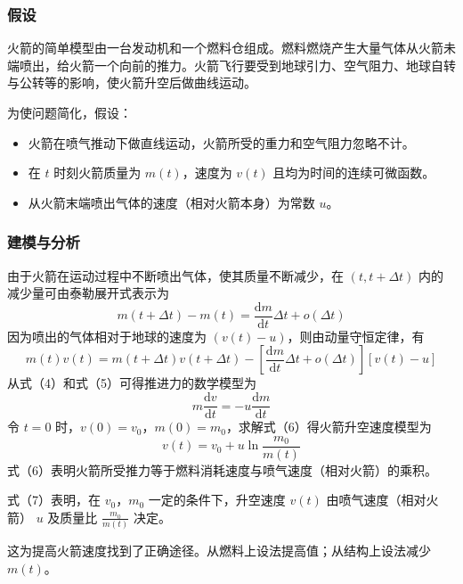 \documentclass[a4,10pt,zihao=-4]{ctexart}
\begin{document}
\subsubsection{假设}

火箭的简单模型由一台发动机和一个燃料仓组成。燃料燃烧产生大量气体从火箭未端喷出，给火箭一个向前的推力。火箭飞行要受到地球引力、空气阻力、地球自转与公转等的影响，使火箭升空后做曲线运动。

为使问题简化，假设：

\begin{itemize}
    \item 火箭在喷气推动下做直线运动，火箭所受的重力和空气阻力忽略不计。
    \item 在 $t$ 时刻火箭质量为 $m(t)$，速度为 $v(t)$ 且均为时间的连续可微函数。
    \item 从火箭末端喷出气体的速度（相对火箭本身）为常数 $u$。
\end{itemize}

\subsubsection{建模与分析}

由于火箭在运动过程中不断喷出气体，使其质量不断减少，在 $(t, t+\Delta t)$ 内的减少量可由泰勒展开式表示为
\begin{equation}
m(t+\Delta t)-m(t)=\frac{\text{d}m}{\text{d}t}\Delta t + o(\Delta t)
\end{equation}
因为喷出的气体相对于地球的速度为 $(v(t)-u)$，则由动量守恒定律，有
\begin{equation}
m(t)v(t) = m(t + \Delta t) v(t + \Delta t) - \left[\frac{\text{d}m}{\text{d}t}\Delta t + o(\Delta t)\right][v(t)-u]
\end{equation}
从式（4）和式（5）可得推进力的数学模型为
\begin{equation}
m\frac{\text{d}v}{\text{d}t} = -u\frac{\text{d}m}{\text{d}t}
\end{equation}
令 $t =0$ 时，$v(0) = v_0$，$m(0) = m_0$，求解式（6）得火箭升空速度模型为
\begin{equation}
v(t)=v_0+u\ln \frac{m_0}{m(t)}
\end{equation}
式（6）表明火箭所受推力等于燃料消耗速度与喷气速度（相对火箭）的乘积。

式（7）表明，在 $v_0$，$m_0$ 一定的条件下，升空速度 $v(t)$ 由喷气速度（相对火箭） $u$ 及质量比 $\frac{m_0}{m(t)}$ 决定。

这为提高火箭速度找到了正确途径。从燃料上设法提高值；从结构上设法减少 $m(t)$。
\end{document}
